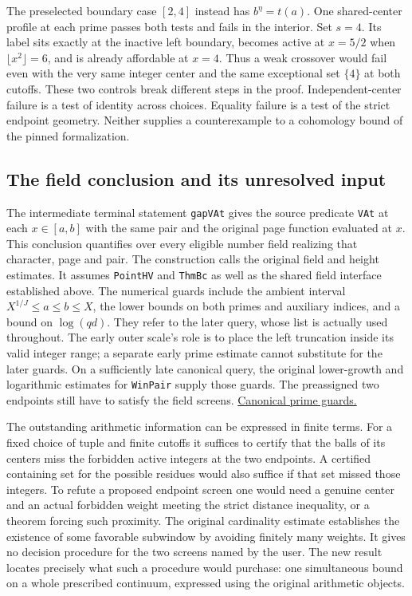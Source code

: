 \documentclass[12pt,letterpaper]{article}
\begin{document}
The preselected boundary case $[2,4]$ instead has $b^\eta=t(a)$. One shared-center profile at each prime passes both tests and fails in the interior. Set $s=4$. Its label sits exactly at the inactive left boundary, becomes active at $x=5/2$ when $\lfloor x^2\rfloor=6$, and is already affordable at $x=4$. Thus a weak crossover would fail even with the very same integer center and the same exceptional set $\{4\}$ at both cutoffs. These two controls break different steps in the proof. Independent-center failure is a test of identity across choices. Equality failure is a test of the strict endpoint geometry. Neither supplies a counterexample to a cohomology bound of the pinned formalization.

\subsection{The field conclusion and its unresolved input}

The intermediate terminal statement \texttt{gapVAt} gives the source predicate \texttt{VAt} at each $x\in[a,b]$ with the same pair and the original page function evaluated at $x$. This conclusion quantifies over every eligible number field realizing that character, page and pair. The construction calls the original field and height estimates. It assumes \texttt{PointHV} and \texttt{ThmBc} as well as the shared field interface established above. The numerical guards include the ambient interval $X^{1/J}\le a\le b\le X$, the lower bounds on both primes and auxiliary indices, and a bound on $\log(qd)$. They refer to the later query, whose list is actually used throughout. The early outer scale's role is to place the left truncation inside its valid integer range; a separate early prime estimate cannot substitute for the later guards. On a sufficiently late canonical query, the original lower-growth and logarithmic estimates for \texttt{WinPair} supply those guards. The preassigned two endpoints still have to satisfy the field screens. \href{https://github.com/nousentllc/riemann-hypothesis/blob/40e56bab026552e089d7afcfeff08d2defb9c005/src/Development/AutomorphicArithmetic/AutomorphicVarieties/CMFieldExponentialBounds/AdmissibleOfPageN.lean#L38-L94}{Canonical prime guards.}

The outstanding arithmetic information can be expressed in finite terms. For a fixed choice of tuple and finite cutoffs it suffices to certify that the balls of its centers miss the forbidden active integers at the two endpoints. A certified containing set for the possible residues would also suffice if that set missed those integers. To refute a proposed endpoint screen one would need a genuine center and an actual forbidden weight meeting the strict distance inequality, or a theorem forcing such proximity. The original cardinality estimate establishes the existence of some favorable subwindow by avoiding finitely many weights. It gives no decision procedure for the two screens named by the user. The new result locates precisely what such a procedure would purchase: one simultaneous bound on a whole prescribed continuum, expressed using the original arithmetic objects.
\end{document}
